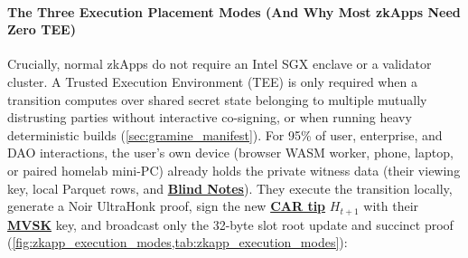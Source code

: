 \documentclass[a4paper,11pt,twoside,parskip=half-,headings=small]{scrartcl}
\newcommand{\concept}[2]{\hyperlink{glossary:#1}{\textbf{#2}}}
\begin{document}
\paragraph{The Three Execution Placement Modes (And Why Most zkApps Need Zero TEE)}
Crucially, normal zkApps do not require an Intel SGX enclave or a validator cluster. A Trusted Execution Environment (TEE) is only required when a transition computes over shared secret state belonging to multiple mutually distrusting parties without interactive co-signing, or when running heavy deterministic builds (\cref{sec:gramine_manifest}). For 95\% of user, enterprise, and DAO interactions, the user's own device (browser WASM worker, phone, laptop, or paired homelab mini-PC) already holds the private witness data (their viewing key, local Parquet rows, and \concept{blind_notes}{Blind Notes}). They execute the transition locally, generate a Noir UltraHonk proof, sign the new \concept{car}{CAR tip} $H_{t+1}$ with their \concept{mvsk}{MVSK} key, and broadcast only the 32-byte slot root update and succinct proof (\cref{fig:zkapp_execution_modes,tab:zkapp_execution_modes}):
\end{document}
